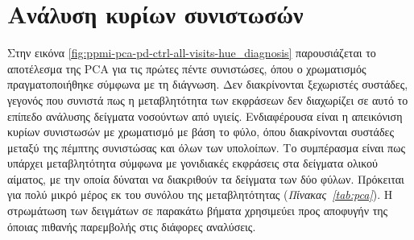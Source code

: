 \documentclass[12pt]{report}
\begin{document}
        \section{Ανάλυση κυρίων συνιστωσών}
            \par
                Στην εικόνα \ref{fig:ppmi-pca-pd-ctrl-all-visits-hue_diagnosis} παρουσιάζεται το αποτέλεσμα της PCA για τις πρώτες πέντε συνιστώσες, όπου ο χρωματισμός πραγματοποιήθηκε σύμφωνα με τη διάγνωση. Δεν διακρίνονται ξεχωριστές συστάδες, γεγονός που συνιστά πως η μεταβλητότητα των εκφράσεων δεν διαχωρίζει σε αυτό το επίπεδο ανάλυσης δείγματα νοσούντων από υγιείς. Ενδιαφέρουσα είναι η απεικόνιση κυρίων συνιστωσών με χρωματισμό με βάση το φύλο, όπου διακρίνονται συστάδες μεταξύ της πέμπτης συνιστώσας και όλων των υπολοίπων. Το συμπέρασμα είναι πως υπάρχει μεταβλητότητα σύμφωνα με γονιδιακές εκφράσεις στα δείγματα ολικού αίματος, με την οποία δύναται να διακριθούν τα δείγματα των δύο φύλων. Πρόκειται για πολύ μικρό μέρος εκ του συνόλου της μεταβλητότητας (\emph{Πίνακας~\ref{tab:pca}}). Η στρωμάτωση των δειγμάτων σε παρακάτω βήματα χρησιμεύει προς αποφυγήν της όποιας πιθανής παρεμβολής στις διάφορες αναλύσεις.
\end{document}
